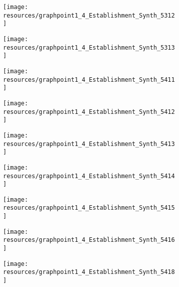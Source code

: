 \documentclass[12pt]{article}
\begin{document}
\begin{figure}[H]
	\centering
	\begin{subfigure}[b]{0.4\textwidth}
	    \texttt{[image: resources/graphpoint1\_4\_Establishment\_Synth\_5312]}
	\end{subfigure}
	\begin{subfigure}[b]{0.4\textwidth}
	    \texttt{[image: resources/graphpoint1\_4\_Establishment\_Synth\_5313]}
	\end{subfigure}
\end{figure}

\begin{figure}[H]
	\centering
	\begin{subfigure}[b]{0.4\textwidth}
	    \texttt{[image: resources/graphpoint1\_4\_Establishment\_Synth\_5411]}
	\end{subfigure}
	\begin{subfigure}[b]{0.4\textwidth}
	    \texttt{[image: resources/graphpoint1\_4\_Establishment\_Synth\_5412]}
	\end{subfigure}
\end{figure}

\begin{figure}[H]
	\centering
	\begin{subfigure}[b]{0.4\textwidth}
	    \texttt{[image: resources/graphpoint1\_4\_Establishment\_Synth\_5413]}
	\end{subfigure}
	\begin{subfigure}[b]{0.4\textwidth}
	    \texttt{[image: resources/graphpoint1\_4\_Establishment\_Synth\_5414]}
	\end{subfigure}
\end{figure}

\begin{figure}[H]
	\centering
	\begin{subfigure}[b]{0.4\textwidth}
	    \texttt{[image: resources/graphpoint1\_4\_Establishment\_Synth\_5415]}
	\end{subfigure}
\end{figure}

\begin{figure}[H]
	\centering
	\begin{subfigure}[b]{0.4\textwidth}
	    \texttt{[image: resources/graphpoint1\_4\_Establishment\_Synth\_5416]}
	\end{subfigure}
	\begin{subfigure}[b]{0.4\textwidth}
	    \texttt{[image: resources/graphpoint1\_4\_Establishment\_Synth\_5418]}
	\end{subfigure}
\end{figure}
\end{document}
